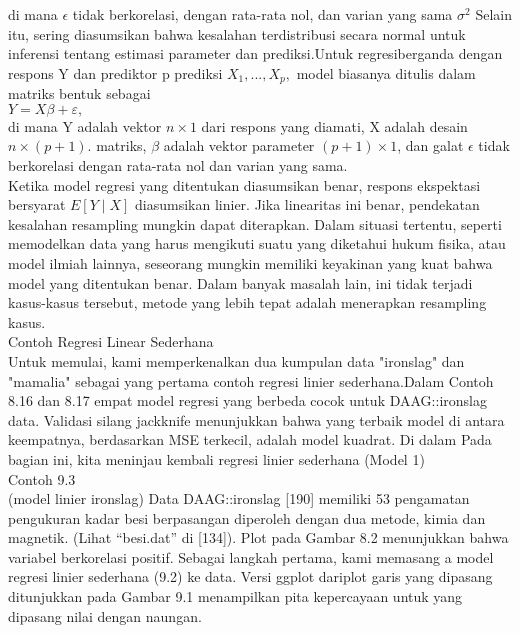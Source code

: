 \documentclass[a4paper,12pt]{article}
\theoremstyle{definition}
\begin{document}
di mana $\epsilon$ tidak berkorelasi, dengan rata-rata nol, dan varian yang sama $\sigma ^{2}$  Selain itu, sering diasumsikan bahwa kesalahan terdistribusi secara normal untuk inferensi tentang estimasi parameter dan prediksi.Untuk regresiberganda dengan respons Y dan prediktor p prediksi $X_{1},...,X_{p},$ model biasanya ditulis dalam matriks bentuk sebagai\\
$Y=X\beta +\varepsilon,$  \\
di mana Y adalah vektor $n\times 1$  dari respons yang diamati, X adalah desain $n\times\left ( p+1 \right )$. matriks, $\beta$ adalah vektor parameter $\left (p+1  \right )\times 1$, dan galat $\epsilon$ tidak berkorelasi dengan rata-rata nol dan varian yang sama.\\
Ketika model regresi yang ditentukan diasumsikan benar, respons ekspektasi bersyarat $E\left [ Y\mid X \right ]$ diasumsikan linier. Jika linearitas ini benar, pendekatan kesalahan resampling mungkin dapat diterapkan. Dalam situasi tertentu, seperti memodelkan data yang harus mengikuti suatu yang diketahui hukum fisika, atau model ilmiah lainnya, seseorang mungkin memiliki keyakinan yang kuat bahwa model yang ditentukan benar. Dalam banyak masalah lain, ini tidak terjadi kasus-kasus tersebut, metode yang lebih tepat adalah menerapkan resampling kasus.\\

Contoh Regresi Linear Sederhana\\

Untuk memulai, kami memperkenalkan dua kumpulan data "ironslag" dan "mamalia" sebagai yang pertama contoh regresi linier sederhana.Dalam Contoh 8.16 dan 8.17 empat model regresi yang berbeda cocok untuk DAAG::ironslag data.  Validasi silang jackknife menunjukkan bahwa yang terbaik model di antara keempatnya, berdasarkan MSE terkecil, adalah model kuadrat. Di dalam Pada bagian ini, kita meninjau kembali regresi linier sederhana (Model 1)\\

Contoh 9.3 \\ 

(model linier ironslag) Data DAAG::ironslag [190] memiliki 53 pengamatan pengukuran kadar besi berpasangan diperoleh dengan dua metode, kimia dan magnetik. (Lihat “besi.dat” di [134]). Plot pada Gambar 8.2 menunjukkan bahwa variabel berkorelasi positif. Sebagai langkah pertama, kami memasang a model regresi linier sederhana (9.2) ke data. Versi ggplot dariplot garis yang dipasang ditunjukkan pada Gambar 9.1 menampilkan pita kepercayaan untuk yang dipasang nilai dengan naungan.\\
\end{document}
